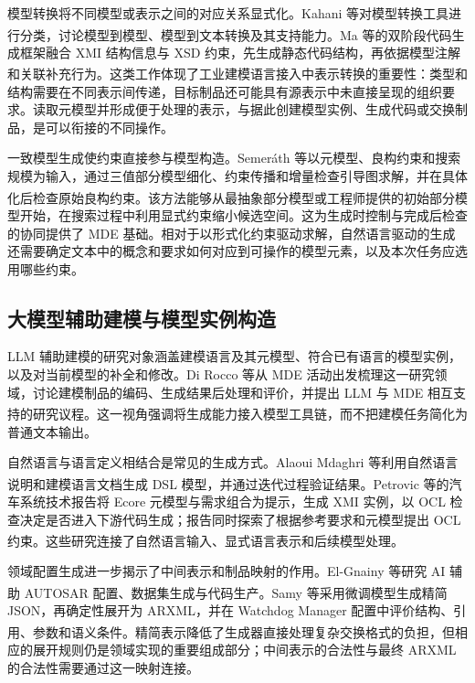 \documentclass[pdflatex,iicol,sn-mathphys-num]{sn-jnl}
\newcommand{\paperref}[1]{\textsuperscript{\textcolor{citationred}{\citep{#1}}}}
\begin{document}
模型转换将不同模型或表示之间的对应关系显式化。Kahani 等对模型转换工具进行分类，讨论模型到模型、模型到文本转换及其支持能力\paperref{Kahani2019}。Ma 等的双阶段代码生成框架融合 XMI 结构信息与 XSD 约束，先生成静态代码结构，再依据模型注解和关联补充行为\paperref{Ma_2025a}。这类工作体现了工业建模语言接入中表示转换的重要性：类型和结构需要在不同表示间传递，目标制品还可能具有源表示中未直接呈现的组织要求。读取元模型并形成便于处理的表示，与据此创建模型实例、生成代码或交换制品，是可以衔接的不同操作。


一致模型生成使约束直接参与模型构造。Semeráth 等以元模型、良构约束和搜索规模为输入，通过三值部分模型细化、约束传播和增量检查引导图求解，并在具体化后检查原始良构约束\paperref{Semer_th_2018}。该方法能够从最抽象部分模型或工程师提供的初始部分模型开始，在搜索过程中利用显式约束缩小候选空间。这为生成时控制与完成后检查的协同提供了 MDE 基础。相对于以形式化约束驱动求解，自然语言驱动的生成还需要确定文本中的概念和要求如何对应到可操作的模型元素，以及本次任务应选用哪些约束。


\subsection{大模型辅助建模与模型实例构造}\label{sec:related-2-2}

LLM 辅助建模的研究对象涵盖建模语言及其元模型、符合已有语言的模型实例，以及对当前模型的补全和修改。Di Rocco 等从 MDE 活动出发梳理这一研究领域，讨论建模制品的编码、生成结果后处理和评价，并提出 LLM 与 MDE 相互支持的研究议程\paperref{DiRocco2025}。这一视角强调将生成能力接入模型工具链，而不把建模任务简化为普通文本输出。


自然语言与语言定义相结合是常见的生成方式。Alaoui Mdaghri 等利用自然语言说明和建模语言文档生成 DSL 模型，并通过迭代过程验证结果\paperref{10.1007/978-3-031-85356-2_8}。Petrovic 等的汽车系统技术报告将 Ecore 元模型与需求组合为提示，生成 XMI 实例，以 OCL 检查决定是否进入下游代码生成；报告同时探索了根据参考要求和元模型提出 OCL 约束\paperref{https://doi.org/10.48550/arxiv.2404.05508}。这些研究连接了自然语言输入、显式语言表示和后续模型处理。


领域配置生成进一步揭示了中间表示和制品映射的作用。El-Gnainy 等研究 AI 辅助 AUTOSAR 配置、数据集生成与代码生产\paperref{El_Gnainy_2024}。Samy 等采用微调模型生成精简 JSON，再确定性展开为 ARXML，并在 Watchdog Manager 配置中评价结构、引用、参数和语义条件\paperref{Samy_2026}。精简表示降低了生成器直接处理复杂交换格式的负担，但相应的展开规则仍是领域实现的重要组成部分；中间表示的合法性与最终 ARXML 的合法性需要通过这一映射连接。
\end{document}
